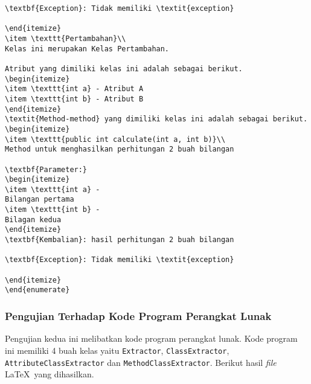 \begin{lstlisting}[caption=Hasil Pengujian Pertama]
\textbf{Exception}: Tidak memiliki \textit{exception}

\end{itemize}
\item \texttt{Pertambahan}\\ 
Kelas ini merupakan Kelas Pertambahan.

Atribut yang dimiliki kelas ini adalah sebagai berikut.
\begin{itemize}
\item \texttt{int a} - Atribut A
\item \texttt{int b} - Atribut B
\end{itemize}
\textit{Method-method} yang dimiliki kelas ini adalah sebagai berikut.
\begin{itemize}
\item \texttt{public int calculate(int a, int b)}\\ 
Method untuk menghasilkan perhitungan 2 buah bilangan

\textbf{Parameter:}
\begin{itemize}
\item \texttt{int a} - 
Bilangan pertama
\item \texttt{int b} - 
Bilagan kedua
\end{itemize}
\textbf{Kembalian}: hasil perhitungan 2 buah bilangan

\textbf{Exception}: Tidak memiliki \textit{exception}

\end{itemize}
\end{enumerate}

\end{lstlisting}

\subsubsection{Pengujian Terhadap Kode Program Perangkat Lunak}
\label{sec:pengujian perangkat lunak}
Pengujian kedua ini melibatkan kode program perangkat lunak. Kode program ini memiliki 4 buah kelas yaitu \texttt{Extractor}, \texttt{ClassExtractor}, \texttt{AttributeClassExtractor} dan \texttt{MethodClassExtractor}. Berikut hasil {\it file} \LaTeX\ yang dihasilkan.

